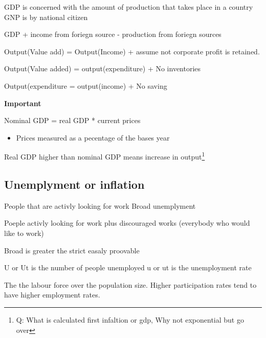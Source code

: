 \documentclass[]{article}
\providecommand{\tightlist}{%
  \setlength{\itemsep}{0pt}\setlength{\parskip}{0pt}}
\begin{document}
GDP is concerned with the amount of production that takes place in a
country GNP is by national citizen

GDP + income from foriegn source - production from foriegn sources

Output(Value add) = Output(Income) + assume not corporate profit is
retained.

Output(Value added) = output(expenditure) + No inventories

Output(expenditure = output(income) + No saving

\textbf{Important}

\begin{description}
\tightlist
\item[Nominal vs real GDP]
Nominal GDP = real GDP * current prices
\end{description}

\begin{itemize}
\tightlist
\item
  Prices measured as a pecentage of the bases year
\end{itemize}

Real GDP higher than nominal GDP means increase in output\footnote{Q:
  What is calculated first infaltion or gdp, Why not exponential but go
  over}

\hypertarget{unemplyment-or-inflation}{%
\subsection{Unemplyment or inflation}\label{unemplyment-or-inflation}}

\begin{description}
\tightlist
\item[Strict unemployment]
People that are activly looking for work Broad unemplyment

Poeple activly looking for work plus discouraged works (everybody who
would like to work)
\end{description}

Broad is greater the strict easaly proovable

U or Ut is the number of people unemployed u or ut is the unemployment
rate

\begin{description}
\tightlist
\item[Paticipation rate]
The the labour force over the population size. Higher participation
rates tend to have higher employment rates.
\end{description}
\end{document}
